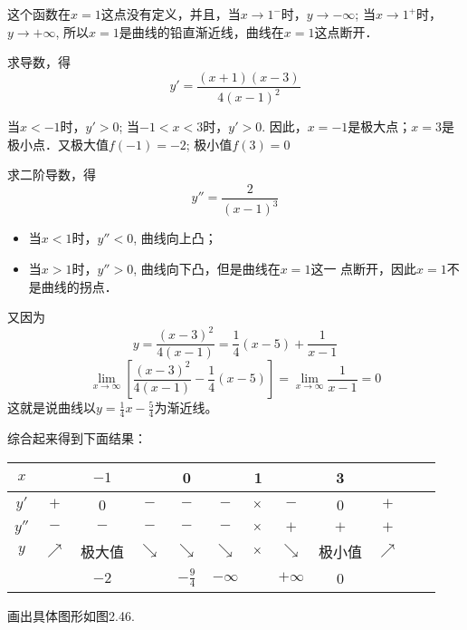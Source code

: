\begin{solution}
    这个函数在$x=1$这点没有定义，并且，当$x\to 1^-$时，$y\to -\infty$; 当$x\to 1^+$时，$y\to +\infty$, 所以$x=1$是曲线的铅直渐近线，曲线在$x=1$这点断开．
    
求导数，得
\[y'= \frac{(x+1) (x-3)}{4 (x-1)^2}\]

当$x<-1$时，$y'>0$; 当$-1<x<3$时，$y'>0$. 因此，$x=-1$是极大点；$x=3$是极小点．又极大值$f(-1)=-2$; 极小值$f(3)=0$

求二阶导数，得
\[y''=\frac{2}{(x-1)^3}\]
\begin{itemize}
    \item 当$x<1$时，$y''<0$, 曲线向上凸；
    \item 当$x>1$时，$y''>0$, 曲线向下凸，但是曲线在$x=1$这一
    点断开，因此$x=1$不是曲线的拐点．
\end{itemize}

又因为
\[y=\frac{(x-3)^2}{4(x-1)}=\frac{1}{4}(x-5)+\frac{1}{x-1}\]
\[\lim_{x\to \infty}\left[\frac{(x-3)^2}{4(x-1)}-\frac{1}{4}(x-5)\right]=\lim_{x\to\infty}\frac{1}{x-1}=0\]
这就是说曲线以$y=\frac{1}{4}x-\frac{5}{4}$为渐近线。

综合起来得到下面结果：
\begin{center}
    \begin{tabular}{cccccccccccc}
    \hline
    $x$ & &$-1$&&0&&1&&3&\\
    \hline
    $y'$& $+$ & 0&$-$&$-$&$-$&$\times$&$-$&0&$+$\\
    $y''$&$-$&$-$&$-$&$-$&$-$&$\times$&$+$&$+$&$+$\\
    $y$&$\nearrow$ &极大值& $\searrow$  & $\searrow$&$\searrow$ & $\times$& $\searrow$ & 极小值 & $\nearrow$  \\
    &  &$-2$&&$-\frac{9}{4}$&$-\infty $&&$+\infty$&0 &\\
    \hline
    \end{tabular}
    \end{center}

画出具体图形如图2.46.
\begin{figure}[htp]
    \centering
{} 
    \caption{}
\end{figure}
\end{solution}



